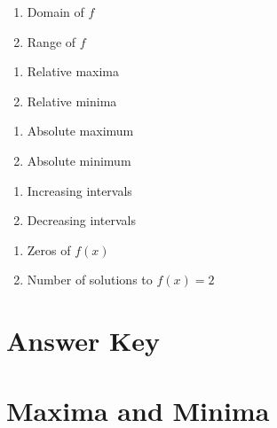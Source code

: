 \begin{multicols}{2}
\begin{enumerate}		\setcounter{enumi}{\value{Review}}
	\item Domain of $f$
    \item Range of $f$
\end{enumerate}	\setcounter{Review}{\value{enumi}}
\end{multicols}
\begin{multicols}{2}
\begin{enumerate}	\setcounter{enumi}{\value{Review}}  
    \item Relative maxima
    \item Relative minima
\end{enumerate}	\setcounter{Review}{\value{enumi}}
\end{multicols}
\begin{multicols}{2}
\begin{enumerate}	\setcounter{enumi}{\value{Review}}  
    \item Absolute maximum
    \item Absolute minimum
\end{enumerate}	\setcounter{Review}{\value{enumi}}
\end{multicols}
\begin{multicols}{2}
\begin{enumerate}	\setcounter{enumi}{\value{Review}}  
    \item Increasing intervals
    \item Decreasing intervals
\end{enumerate}	\setcounter{Review}{\value{enumi}}
\end{multicols}
\begin{multicols}{2}
\begin{enumerate}	\setcounter{enumi}{\value{Review}}  
    \item Zeros of $f(x)$
    \item Number of solutions to $f(x)=2$
\end{enumerate}		\setcounter{Review}{\value{enumi}}
\end{multicols}

\newpage

\section{Answer Key}

\section*{Maxima and Minima}

